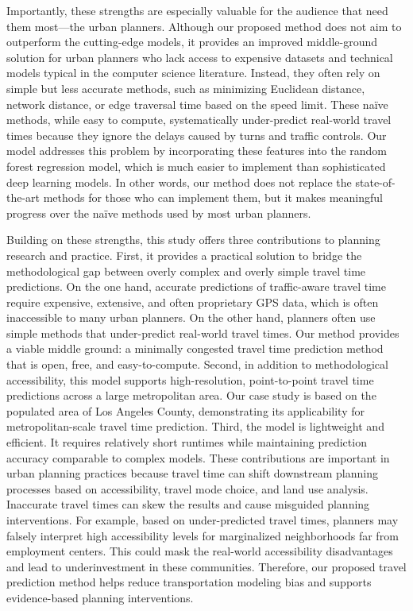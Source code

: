 \documentclass[12pt,letterpaper]{article} %
\begin{document}
    Importantly, these strengths are especially valuable for the audience that need them most---the urban planners. Although our proposed method does not aim to outperform the cutting-edge models, it provides an improved middle-ground solution for urban planners who lack access to expensive datasets and technical models typical in the computer science literature. Instead, they often rely on simple but less accurate methods, such as minimizing Euclidean distance, network distance, or edge traversal time based on the speed limit. These naïve methods, while easy to compute, systematically under-predict real-world travel times because they ignore the delays caused by turns and traffic controls. Our model addresses this problem by incorporating these features into the random forest regression model, which is much easier to implement than sophisticated deep learning models. In other words, our method does not replace the state-of-the-art methods for those who can implement them, but it makes meaningful progress over the naïve methods used by most urban planners.

    Building on these strengths, this study offers three contributions to planning research and practice. First, it provides a practical solution to bridge the methodological gap between overly complex and overly simple travel time predictions. On the one hand, accurate predictions of traffic-aware travel time require expensive, extensive, and often proprietary GPS data, which is often inaccessible to many urban planners. On the other hand, planners often use simple methods that under-predict real-world travel times. Our method provides a viable middle ground: a minimally congested travel time prediction method that is open, free, and easy-to-compute. Second, in addition to methodological accessibility, this model supports high-resolution, point-to-point travel time predictions across a large metropolitan area. Our case study is based on the populated area of Los Angeles County, demonstrating its applicability for metropolitan-scale travel time prediction. Third, the model is lightweight and efficient. It requires relatively short runtimes while maintaining prediction accuracy comparable to complex models. These contributions are important in urban planning practices because travel time can shift downstream planning processes based on accessibility, travel mode choice, and land use analysis. Inaccurate travel times can skew the results and cause misguided planning interventions. For example, based on under-predicted travel times, planners may falsely interpret high accessibility levels for marginalized neighborhoods far from employment centers. This could mask the real-world accessibility disadvantages and lead to underinvestment in these communities. Therefore, our proposed travel prediction method helps reduce transportation modeling bias and supports evidence-based planning interventions.
\end{document}
